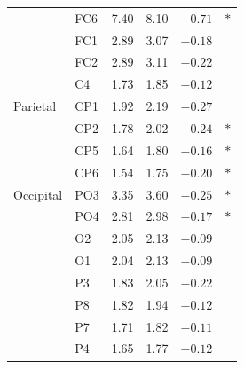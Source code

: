 \documentclass[journal,twoside,web]{ieeecolor}
\begin{document}
\begin{table}[htbp]
\begin{tabular}{@{}llrrrc@{}}
     & FC6 & 7.40 & 8.10 & $-0.71$ & $*$ \\
     & FC1 & 2.89 & 3.07 & $-0.18$ & \\
     & FC2 & 2.89 & 3.11 & $-0.22$ & \\
     & C4 & 1.73 & 1.85 & $-0.12$ & \\
    \addlinespace
    Parietal & CP1 & 1.92 & 2.19 & $-0.27$ & \\
     & CP2 & 1.78 & 2.02 & $-0.24$ & $*$ \\
     & CP5 & 1.64 & 1.80 & $-0.16$ & $*$ \\
     & CP6 & 1.54 & 1.75 & $-0.20$ & $*$ \\
    \addlinespace
    Occipital & PO3 & 3.35 & 3.60 & $-0.25$ & $*$ \\
     & PO4 & 2.81 & 2.98 & $-0.17$ & $*$ \\
     & O2 & 2.05 & 2.13 & $-0.09$ & \\
     & O1 & 2.04 & 2.13 & $-0.09$ & \\
     & P3 & 1.83 & 2.05 & $-0.22$ & \\
     & P8 & 1.82 & 1.94 & $-0.12$ & \\
     & P7 & 1.71 & 1.82 & $-0.11$ & \\
     & P4 & 1.65 & 1.77 & $-0.12$ & \\
    \bottomrule
  \end{tabular}
\end{table}
\end{document}
